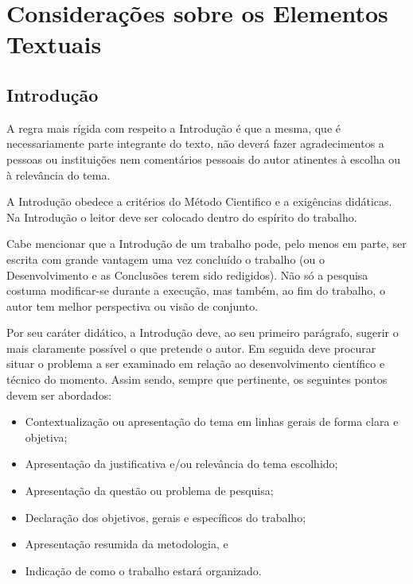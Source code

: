 \chapter[Considerações sobre os Elementos Textuais]{Considerações sobre os
Elementos Textuais}

\section{Introdução}

A regra mais rígida com respeito a Introdução é que a mesma, que é
necessariamente parte integrante do texto, não deverá fazer agradecimentos
a pessoas ou instituições nem comentários pessoais do autor atinentes à
escolha ou à relevância do tema.

A Introdução obedece a critérios do Método Cientifico e a exigências
didáticas. Na Introdução o leitor deve ser colocado dentro do espírito do
trabalho.

Cabe mencionar que a Introdução de um trabalho pode, pelo menos em parte,
ser escrita com grande vantagem uma vez concluído o trabalho (ou o
Desenvolvimento e as Conclusões terem sido redigidos). Não só a pesquisa
costuma modificar-se durante a execução, mas também, ao fim do trabalho, o
autor tem melhor perspectiva ou visão de conjunto.

Por seu caráter didático, a Introdução deve, ao seu primeiro parágrafo,
sugerir o mais claramente possível o que pretende o autor. Em seguida deve
procurar situar o problema a ser examinado em relação ao desenvolvimento
científico e técnico do momento. Assim sendo, sempre que pertinente, os
seguintes pontos devem ser abordados:

\begin{itemize}

	\item Contextualização ou apresentação do tema em linhas gerais de
	forma clara e objetiva;
	\item Apresentação da justificativa e/ou relevância do tema escolhido;
	\item Apresentação da questão ou problema de pesquisa;
	\item Declaração dos objetivos, gerais e específicos do trabalho;
	\item Apresentação resumida da metodologia, e
	\item Indicação de como o trabalho estará organizado.

\end{itemize}

